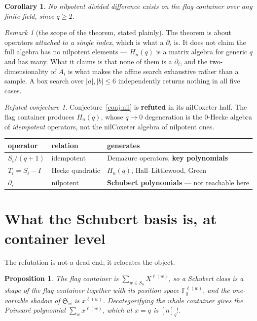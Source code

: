 \documentclass[11pt,a4paper]{article}
\newtheorem{proposition}[theorem]{Proposition}
\newtheorem{corollary}[theorem]{Corollary}
\theoremstyle{definition}
\theoremstyle{remark}
\newtheorem{remark}[theorem]{Remark}
\newtheorem{refuted}[theorem]{Refuted conjecture}
\newcommand{\FF}{\mathbb{F}}
\newcommand{\Schub}{\mathfrak{S}}
\newcommand{\NO}{\textcolor{nored}{\textbf{refuted}}}
\begin{document}
\begin{corollary}
No nilpotent divided difference exists on the flag container over any finite
field, since $q \ge 2$.
\end{corollary}

\begin{remark}[the scope of the theorem, stated plainly]
The theorem is about operators \emph{attached to a single index}, which is what
a $\partial_i$ is. It does not claim the full algebra has no nilpotent elements
--- $H_n(q)$ is a matrix algebra for generic $q$ and has many. What it claims is
that none of them is a $\partial_i$, and the two-dimensionality of $A_i$ is what
makes the affine search exhaustive rather than a sample. A box search over
$|a|, |b| \le 6$ independently returns nothing in all five cases.
\end{remark}

\begin{refuted}\label{ref:nil}
Conjecture~\ref{conj:nil} is \NO{} in its nilCoxeter half. The flag container
produces $H_n(q)$, whose $q \to 0$ degeneration is the $0$-Hecke algebra of
\emph{idempotent} operators, not the nilCoxeter algebra of nilpotent ones.
\end{refuted}

\begin{center}
\small
\begin{tabular}{lll}
\toprule
operator & relation & generates \\
\midrule
$S_i/(q+1)$      & idempotent        & Demazure operators, \textbf{key polynomials} \\
$T_i = S_i - I$  & Hecke quadratic   & $H_n(q)$, Hall--Littlewood, Green \\
$\partial_i$     & nilpotent         & \textbf{Schubert polynomials} --- not reachable here \\
\bottomrule
\end{tabular}
\end{center}

\section{What the Schubert basis is, at container level}

The refutation is not a dead end; it relocates the object.

\begin{proposition}
The flag container is $\sum_{w \in S_n} X^{\ell(w)}$, so a Schubert class is a
\emph{shape} of the flag container together with its position space
$\FF_q^{\ell(w)}$, and the one-variable shadow of $\Schub_w$ is $x^{\ell(w)}$.
Decategorifying the whole container gives the Poincar\'e polynomial
$\sum_w x^{\ell(w)}$, which at $x = q$ is $[n]_q!$.
\end{proposition}
\end{document}

